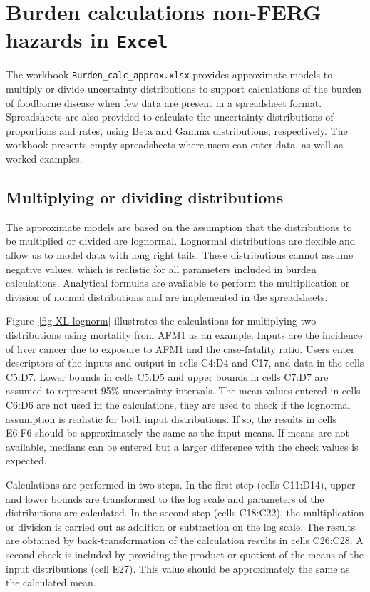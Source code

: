 \documentclass[
  letterpaper,
  DIV=11,
  numbers=noendperiod]{scrartcl}
\begin{document}
\section{\texorpdfstring{Burden calculations non-FERG hazards in
\texttt{Excel}}{Burden calculations non-FERG hazards in Excel}}\label{burden-calculations-non-ferg-hazards-in-excel}

The workbook \texttt{Burden\_calc\_approx.xlsx} provides approximate
models to multiply or divide uncertainty distributions to support
calculations of the burden of foodborne disease when few data are
present in a spreadsheet format. Spreadsheets are also provided to
calculate the uncertainty distributions of proportions and rates, using
Beta and Gamma distributions, respectively. The workbook presents empty
spreadsheets where users can enter data, as well as worked examples.

\subsection{Multiplying or dividing
distributions}\label{multiplying-or-dividing-distributions}

The approximate models are based on the assumption that the
distributions to be multiplied or divided are lognormal. Lognormal
distributions are flexible and allow us to model data with long right
tails. These distributions cannot assume negative values, which is
realistic for all parameters included in burden calculations. Analytical
formulas are available to perform the multiplication or division of
normal distributions and are implemented in the spreadsheets.

Figure~\ref{fig-XL-lognorm} illustrates the calculations for multiplying
two distributions using mortality from AFM1 as an example. Inputs are
the incidence of liver cancer due to exposure to AFM1 and the
case-fatality ratio. Users enter descriptors of the inputs and output in
cells C4:D4 and C17, and data in the cells C5:D7. Lower bounds in cells
C5:D5 and upper bounds in cells C7:D7 are assumed to represent 95\%
uncertainty intervals. The mean values entered in cells C6:D6 are not
used in the calculations, they are used to check if the lognormal
assumption is realistic for both input distributions. If so, the results
in cells E6:F6 should be approximately the same as the input means. If
means are not available, medians can be entered but a larger difference
with the check values is expected.

Calculations are performed in two steps. In the first step (cells
C11:D14), upper and lower bounds are transformed to the log scale and
parameters of the distributions are calculated. In the second step
(cells C18:C22), the multiplication or division is carried out as
addition or subtraction on the log scale. The results are obtained by
back-transformation of the calculation results in cells C26:C28. A
second check is included by providing the product or quotient of the
means of the input distributions (cell E27). This value should be
approximately the same as the calculated mean.
\end{document}
